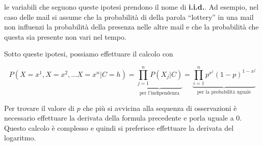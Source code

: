 \noindent le variabili che seguono queste ipotesi prendono il nome di \textbf{i.i.d.}.
Ad esempio, nel caso delle mail si assume che la probabilità di della parola ``lottery'' in una mail non influenzi la probabilità della presenza nelle altre mail e che la probabilità che questa sia presente non vari nel tempo.

Sotto queste ipotesi, possiamo effettuare il calcolo con

$$
P(X = x^1, X=x^2, ... X = x^n | C = h) = \underbrace{\prod\limits_{j = 1}^{n} P(X_j | C)}_{\text{per l'indipendenza}} = \underbrace{\prod\limits_{i = 1}^{n} p^{x^j}(1-p)^{1-{x^j}}}_{\text{per la probabilità uguale}}
$$

\noindent Per trovare il valore di $p$ che più si avvicina alla sequenza di osservazioni è necessario effettuare la derivata della formula precedente e porla uguale a 0. Questo calcolo è complesso e quindi si preferisce effettuare la derivata del logaritmo.

